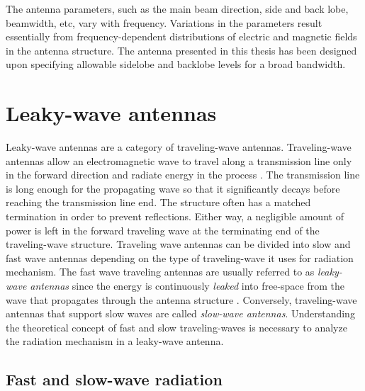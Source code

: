 The antenna parameters, such as the main beam direction, side and back lobe, beamwidth, etc, vary with frequency. Variations in the parameters result essentially from frequency-dependent distributions of electric and magnetic fields in the antenna structure. The antenna presented in this thesis has been designed upon specifying allowable sidelobe and backlobe levels for a broad bandwidth.


\section{Leaky-wave antennas} \label{sec:LW}

Leaky-wave antennas are a category of traveling-wave antennas. Traveling-wave antennas allow an electromagnetic wave to travel along a transmission line only in the forward direction and radiate energy in the process \cite{Balanis2005}\cite{ Walter1965}. The transmission line is long enough for the propagating wave so that it significantly decays before reaching the transmission line end. The structure often has a matched termination in order to prevent reflections. Either way, a negligible amount of power is left in the forward traveling wave at the terminating end of the traveling-wave structure. Traveling wave antennas can be divided into slow and fast wave antennas depending on the type of traveling-wave it uses for radiation mechanism. The fast wave traveling antennas are usually referred to as \textit{leaky-wave antennas} since the energy is continuously \textit{leaked} into free-space from the wave that propagates through the antenna structure \cite{Tamir1969}. Conversely, traveling-wave antennas that support slow waves are called \textit{slow-wave antennas}. Understanding the theoretical concept of fast and slow traveling-waves is necessary to analyze the radiation mechanism in a leaky-wave antenna. 

\subsection{Fast and slow-wave radiation} \label{fastslow}

